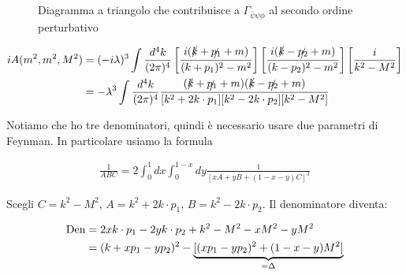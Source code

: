 \documentclass[11pt]{report}
\begin{document}
\begin{figure}
    \caption{Diagramma a triangolo che contribuisce a \(\Gamma_{\bar{\psi}\psi \phi}\) al secondo ordine perturbativo}
    \label{fig:trianglediagram}
    \begin{center}
        \end{center}
\end{figure}

\begin{align}
    iA(m^2, m^2, M^2) &= (-i\lambda)^3 \int \frac{d^4k}{(2\pi)^4}\left[\frac{i(\slashed{k} + \slashed{p_1} +m)}{(k+p_1)^2-m^2} \right]\left[\frac{i(\slashed{k}-\slashed{p_2}+m)}{(k-p_2)^2-m^2} \right]\left[\frac{i}{k^2-M^2} \right] \notag \\ 
    &= -\lambda^3 \int \frac{d^4k}{(2\pi)^4}\frac{(\slashed{k} + \slashed{p_1} + m)(\slashed{k} -\slashed{p_2} + m)}{[k^2 + 2k\cdot p_1][k^2 - 2k\cdot p_2][k^2-M^2]}
\end{align}

Notiamo che ho tre denominatori, quindi è necessario usare due parametri di Feynman. In particolare usiamo la formula

\begin{align}
    \frac{1}{ABC} = 2\int_0^1dx\int_0^{1-x}dy \frac{1}{[xA + yB + (1-x-y)C]^3}
\end{align}

Scegli \(C = k^2-M^2, \, A = k^2 + 2k\cdot p_1, \, B = k^2 - 2k\cdot p_2\). Il denominatore diventa: 

\begin{align}
    \text{Den} &= 2xk\cdot p_1 -2y k\cdot p_2 + k^2 - M^2 -xM^2 -yM^2 \notag \\
    &= (k + xp_1 - yp_2)^2 - \underbrace{[(xp_1 - yp_2)^2 +(1-x-y)M^2]}_{=\Delta} 
\end{align}
\end{document}
